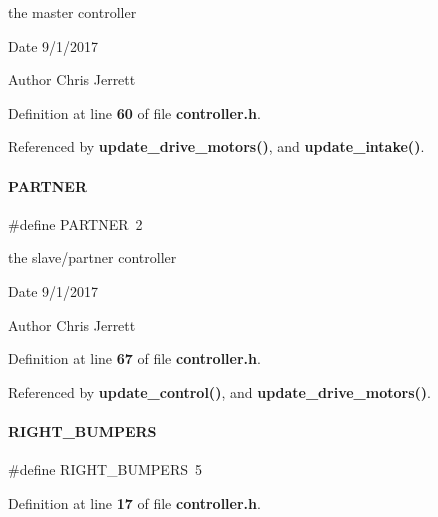 the master controller 

\begin{DoxyDate}{Date}
9/1/2017 
\end{DoxyDate}
\begin{DoxyAuthor}{Author}
Chris Jerrett 
\end{DoxyAuthor}


Definition at line \textbf{ 60} of file \textbf{ controller.\+h}.



Referenced by \textbf{ update\+\_\+drive\+\_\+motors()}, and \textbf{ update\+\_\+intake()}.

\mbox{\label{a00011_a136e64cf351535da81cacb6a546cade6}} 
\paragraph{P\+A\+R\+T\+N\+ER}
{\footnotesize\ttfamily \#define P\+A\+R\+T\+N\+ER~2}



the slave/partner controller 

\begin{DoxyDate}{Date}
9/1/2017 
\end{DoxyDate}
\begin{DoxyAuthor}{Author}
Chris Jerrett 
\end{DoxyAuthor}


Definition at line \textbf{ 67} of file \textbf{ controller.\+h}.



Referenced by \textbf{ update\+\_\+control()}, and \textbf{ update\+\_\+drive\+\_\+motors()}.

\mbox{\label{a00011_a635896b08789914290171051d1b82465}} 
\paragraph{R\+I\+G\+H\+T\+\_\+\+B\+U\+M\+P\+E\+RS}
{\footnotesize\ttfamily \#define R\+I\+G\+H\+T\+\_\+\+B\+U\+M\+P\+E\+RS~5}



Definition at line \textbf{ 17} of file \textbf{ controller.\+h}.

